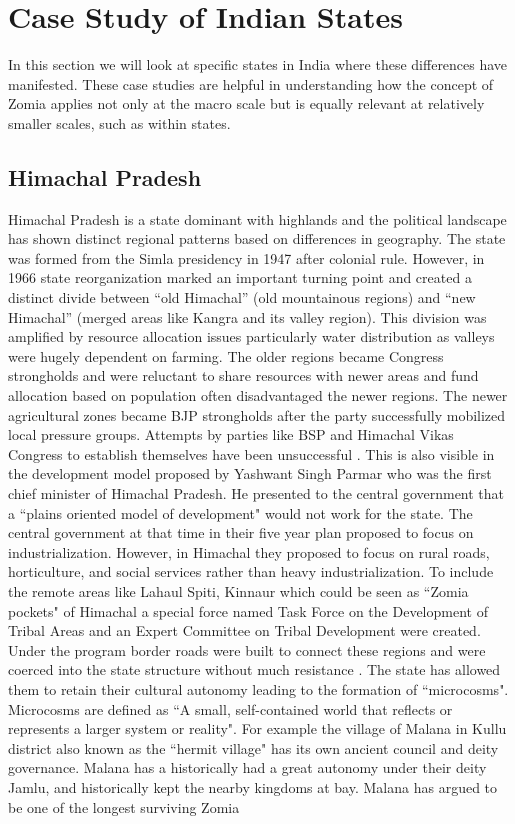 \section{Case Study of Indian States}
In this section we will look at specific states in India where these differences have manifested. These case studies are helpful in understanding how the concept of Zomia applies not only at the macro scale but is equally relevant at relatively smaller scales, such as within states.

\subsection{Himachal Pradesh}
\begin{sloppypar}

 Himachal Pradesh is a state dominant with highlands and the political landscape has shown distinct regional patterns based on differences in geography. The state was formed from the Simla presidency in 1947 after colonial rule. However, in 1966 state reorganization marked an important turning point and created a distinct divide between \enquote{old Himachal} (old mountainous regions) and \enquote{new Himachal} (merged areas like Kangra and its valley region)\citep{TR_Sharma_1987}. This division was amplified by resource allocation issues particularly water distribution as valleys were hugely dependent on farming. The older regions became Congress strongholds and were reluctant to share resources with newer areas and fund allocation based on population often disadvantaged the newer regions. The newer agricultural zones became BJP strongholds after the party successfully mobilized local pressure groups. Attempts by parties like BSP and Himachal Vikas Congress to establish themselves have been unsuccessful \citep{chauhan2004bipolar}. This is also visible in the development model proposed by Yashwant Singh Parmar who was the first chief minister of Himachal Pradesh. He presented to the central government that a ``plains oriented model of development" would not work for the state. The  central government at that time in their five year plan proposed to  focus on industrialization. However, in Himachal they proposed to focus on rural roads, horticulture, and social services rather than heavy industrialization. To include the remote areas like Lahaul Spiti, Kinnaur which could be seen as ``Zomia pockets" of Himachal a special force named Task Force on the Development of Tribal Areas and an Expert Committee on Tribal Development were created. Under the program border roads were built to connect these regions and were coerced into the state structure without much resistance \citep{StateEffectiveness2020}. The state has allowed them to retain their cultural autonomy leading to the formation of ``microcosms". Microcosms are defined as ``A small, self\hyp{}contained world that reflects or represents a larger system or reality". For example the village of Malana in Kullu district also known as the ``hermit village" has its own ancient council and deity governance. Malana has a historically had a great autonomy under their deity Jamlu, and historically  kept the nearby kingdoms at bay. Malana has argued to be one of the longest surviving Zomia 
\end{sloppypar}
